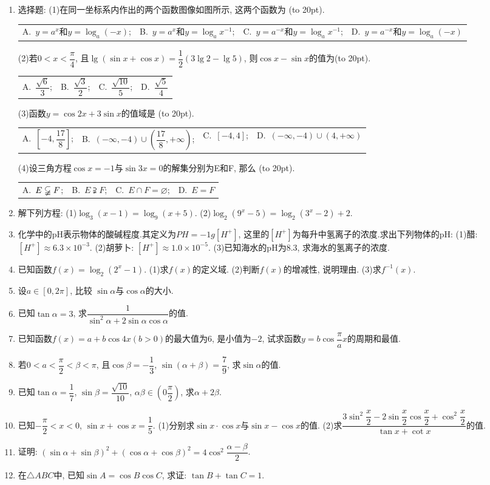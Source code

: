 \documentclass[10pt,a4paper]{article}
\newcommand{\blank}[1]{\underline{\hbox to #1pt{}}}
\newcommand{\bracket}[1]{(\hbox to #1pt{})}
\newcommand{\fourch}[4]{\par\begin{tabular}{p{.23\textwidth}p{.23\textwidth}p{.23\textwidth}p{.23\textwidth}}
A.~#1 &B.~#2& C.~#3& D.~#4
\end{tabular}}
\begin{document}
\begin{enumerate}[1.]
(7)求值: $(1+\tan 21^o)(1+\tan 22^o)(1+\tan 23^o)(1+\tan 24^o)=$\blank{50}.
(8)函数$y=\cos ^2x$单调递增区间为\blank{50}.
\item 选择题:
(1)在同一坐标系内作出的两个函数图像如图所示, 这两个函数为			\bracket{20}.
\fourch{$y=a^x$和$y=\log _a(-x)$;}{$y=a^x$和$y=\log _ax^{-1}$;}{$y=a^{-x}$和$y=\log _ax^{-1}$;}{$y=a^{-x}$和$y=\log _a(-x)$}
(2)若$0<x<\dfrac{\pi }4$, 且$\lg (\sin x+\cos x)=\dfrac 12(3\lg 2-\lg 5)$, 则$\cos x-\sin x$的值为\bracket{20}.
\fourch{$\dfrac{\sqrt 6}3$;}{$\dfrac{\sqrt 3}2$;}{$\dfrac{\sqrt {10}}5$;}{$\dfrac{\sqrt 5}4$}
(3)函数$y=\cos 2x+3\sin x$的值域是							\bracket{20}.
\fourch{$[-4,\dfrac{17}8]$;}{$(-\infty ,-4)\cup (\dfrac{17}8,+\infty)$;}{$[-4,4]$;}{$(-\infty ,-4)\cup (4,+\infty)$}
(4)设三角方程$\cos x=-1$与$\sin 3x=0$的解集分别为E和F, 那么		\bracket{20}.
\fourch{$E\varsubsetneqq F$;}{$E\supsetneqq F$;}{$E\cap F=\varnothing$;}{$E=F$}
\item 解下列方程:
(1)$\log _3(x-1)=\log _9(x+5)$.
(2)$\log _2(9^x-5)=\log _2(3^x-2)+2$.
\item 化学中的pH表示物体的酸碱程度.其定义为$PH=-1g[H^+]$, 这里的$[H^+]$为每升中氢离子的浓度.求出下列物体的pH:
(1)醋: $[H^+]\approx 6.3\times 10^{-3}$.
(2)胡萝卜: $[H^+]\approx 1.0\times 10^{-5}$.
(3)已知海水的pH为8.3, 求海水的氢离子的浓度.
\item 已知函数$f(x)=\log _2(2^x-1)$.
(1)求$f(x)$的定义域.
(2)判断$f(x)$的增减性, 说明理由.
(3)求$f^{-1}(x)$.
\item 设$a\in [0,2\pi]$, 比较 $\sin \alpha$与$\cos \alpha$的大小.
\item 已知$\tan \alpha =3$, 求$\dfrac 1{\sin ^2\alpha +2\sin \alpha \cos \alpha }$的值.
\item 已知函数$f(x)=a+b\cos 4x(b>0)$的最大值为6, 是小值为$-2$, 试求函数$y=b\cos \dfrac{\pi }ax$的周期和最值.
\item 若$0<a<\dfrac{\pi }2<\beta <\pi$, 且$\cos \beta =-\dfrac 13$, $\sin (\alpha +\beta)=\dfrac 79$, 求$\sin \alpha$的值.
\item 已知$\tan \alpha =\dfrac 17$, $\sin \beta =\dfrac{\sqrt {10}}{10}$, $\alpha \beta \in (0\dfrac{\pi }2)$, 求$\alpha +2\beta$.
\item 已知$-\dfrac{\pi }2<x<0$, $\sin x+\cos x=\dfrac 15$.
(1)分别求$\sin x\cdot \cos x$与$\sin x-\cos x$的值.
(2)求$\dfrac{3{{\sin }^2}\dfrac x2-2\sin \dfrac x2\cos \dfrac x2+{{\cos }^2}\dfrac x2}{\tan x+\cot x}$的值.
\item 证明: $(\sin \alpha +\sin \beta)^2+(\cos \alpha +\cos \beta)^2=4\cos ^2\dfrac{\alpha -\beta }2$.
\item 在$\triangle ABC$中, 已知$\sin A=\cos B\cos C$, 求证: $\tan B+\tan C=1$.

\end{enumerate}
\end{document}
